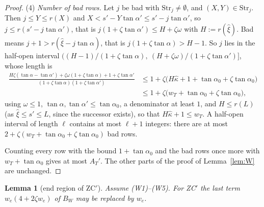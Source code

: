 \documentclass[11pt]{amsart}
\newcommand{\ta}{\tan\alpha}
\newcommand{\taz}{\tan\alpha_0}
\newtheorem{lemma}[theorem]{Lemma}
\theoremstyle{definition}
\theoremstyle{remark}
\numberwithin{equation}{section}
\begin{document}
\begin{proof}
(4) \emph{Number of bad rows.} Let $j$ be bad with $\mathrm{Str}_j\ne\emptyset$, and $(X,Y)\in\mathrm{Str}_j$. Then
$j\le Y\le r(X)$ and $X<s'-Y\ta'\le s'-j\ta'$, so $j\le r(s'-j\ta')$, that is $j(1+\zeta\ta')\le H+\zeta\omega$ with
$H:=r(\hat\xi)$. Bad means $j+1>r(\hat\xi-j\ta)$, that is $j(1+\zeta\ta)>H-1$. So $j$ lies in the half-open interval
$\bigl((H-1)/(1+\zeta\ta),\ (H+\zeta\omega)/(1+\zeta\ta')\bigr]$, whose length is
\begin{align*}
\frac{H\zeta(\ta-\ta')+\zeta\omega(1+\zeta\ta)+1+\zeta\ta'}{(1+\zeta\ta)(1+\zeta\ta')}
&\le1+\zeta\bigl(H\hat\kappa+1+\taz+\zeta\taz\bigr)\\
&\le1+\zeta\bigl(w_T+\taz+\zeta\taz\bigr),
\end{align*}
using $\omega\le1$, $\ta,\ta'\le\taz$, a denominator at least $1$, and $H\le r(L)$ (as $\hat\xi\le s'\le L$, since the
successor exists), so that $H\hat\kappa+1\le w_T$. A half-open interval of length $\ell$ contains at most $\ell+1$
integers: there are at most $2+\zeta(w_T+\taz+\zeta\taz)$ bad rows.

Counting every row with the bound $1+\taz$ and the bad rows once more with $w_T+\taz$ gives at most $A_T'$. The other
parts of the proof of Lemma~\ref{lem:W} are unchanged.
\end{proof}

\begin{lemma}[end region of ZC$'$]\label{lem:P3}
Assume (W1)--(W5). For ZC$'$ the last term $w_e(4+2\zeta w_e)$ of $B_W$ may be replaced by $w_e$.
\end{lemma}
\end{document}
